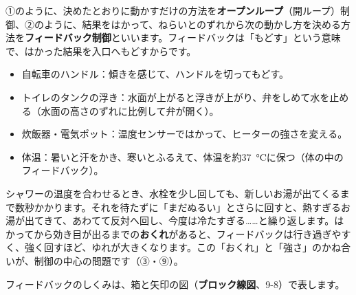 ①のように、決めたとおりに動かすだけの方法を\textbf{オープンループ}（開ループ）制御、②のように、結果をはかって、ねらいとのずれから次の動かし方を決める方法を\textbf{フィードバック制御}といいます。フィードバックは「もどす」という意味で、はかった結果を入口へもどすからです。

\begin{phmijika}[身の周りのフィードバック]
\begin{itemize}[leftmargin=1.2\zw, itemsep=1pt, topsep=1pt, label={\color{phMijikaDeep}●}]
\item 自転車のハンドル：傾きを感じて、ハンドルを切ってもどす。
\item トイレのタンクの浮き：水面が上がると浮きが上がり、弁をしめて水を止める（水面の高さのずれに比例して弁が開く）。
\item 炊飯器・電気ポット：温度センサーではかって、ヒーターの強さを変える。
\item 体温：暑いと汗をかき、寒いとふるえて、体温を約\qty{37}{\celsius}に保つ（体の中のフィードバック）。
\end{itemize}
\end{phmijika}

シャワーの温度を合わせるとき、水栓を少し回しても、新しいお湯が出てくるまで数秒かかります。それを待たずに「まだぬるい」とさらに回すと、熱すぎるお湯が出てきて、あわてて反対へ回し、今度は冷たすぎる……と繰り返します。はかってから効き目が出るまでの\textbf{おくれ}があると、フィードバックは行き過ぎやすく、強く回すほど、ゆれが大きくなります。この「おくれ」と「強さ」のかね合いが、制御の中心の問題です（③・⑨）。

\label{ph:波-4:sec2}
フィードバックのしくみは、箱と矢印の図（\textbf{ブロック線図}、9-8）で表します。

